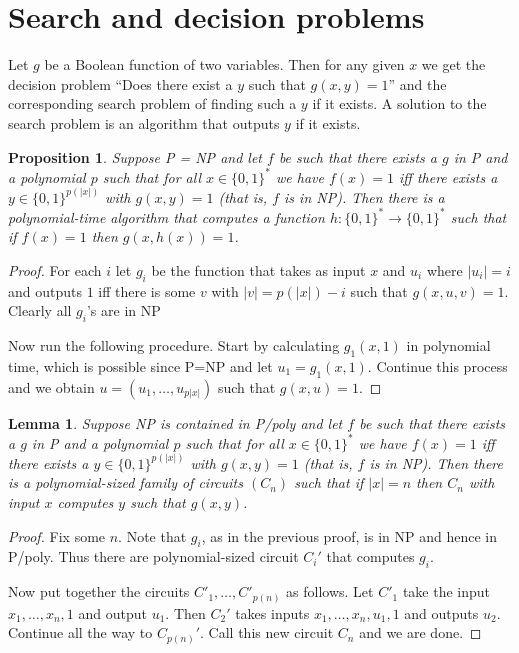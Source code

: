 \documentclass{report}
\theoremstyle{definition}
\theoremstyle{plain}
\newtheorem{prop}[thm]{Proposition}
\newtheorem{lem}[thm]{Lemma}
\theoremstyle{definition}
\begin{document}
	\section{Search and decision problems}
	Let $g$ be a Boolean function of two variables. Then for any given $x$ we get the decision problem ``Does there exist a $y$ such that $g(x,y) = 1$'' and the corresponding search problem of finding such a $y$ if it exists. A solution to the search problem is an algorithm that outputs $y$ if it exists.
	\begin{prop}
		Suppose P = NP and let $f$ be such that there exists a $g$ in P and a polynomial $p$ such that for all $x\in\{0,1\}^*$ we have $f(x) = 1$ iff there exists a $y\in\{0,1\}^{p(|x|)}$ with $g(x,y) = 1$ (that is, $f$ is in NP). Then there is a polynomial-time algorithm that computes a function $h\colon \{0,1\}^* \to \{0,1\}^*$ such that if $f(x) = 1$ then $g(x,h(x)) = 1$.
	\end{prop}
	\begin{proof}
		For each $i$ let $g_i$ be the function that takes as input $x$ and $u_i$ where $|u_i| = i$ and outputs $1$ iff there is some $v$ with $|v| = p(|x|) - i$ such that $g(x, u,v) = 1$. Clearly all $g_i$'s are in NP
		
		Now run the following procedure. Start by calculating $g_1(x,1)$ in polynomial time, which is possible since P=NP and let $u_1 = g_1(x,1)$. Continue this process and we obtain $u = (u_1,\ldots, u_{p|x|})$ such that $g(x,u) = 1$.
	\end{proof}
	\begin{lem}\label{lem:np_in_p/poly_imp_crct}
		Suppose NP is contained in P/poly and let $f$ be such that there exists a $g$ in P and a polynomial $p$ such that for all $x\in\{0,1\}^*$ we have $f(x) = 1$ iff there exists a $y\in\{0,1\}^{p(|x|)}$ with $g(x,y) = 1$ (that is, $f$ is in NP). Then there is a polynomial-sized family of circuits $(C_n)$ such that if $|x| = n$ then $C_n$ with input $x$ computes $y$ such that $g(x,y)$.  
	\end{lem}
	\begin{proof}
		Fix some $n$. Note that $g_i$, as in the previous proof, is in NP and hence in P/poly. Thus there are polynomial-sized circuit $C_i'$ that computes $g_i$.
		
		Now put together the circuits $C'_1, \ldots, C'_{p(n)}$ as follows. Let $C'_1$ take the input $x_1,\ldots, x_n,1$ and output $u_1$. Then $C_2'$ takes inputs $x_1,\ldots, x_n, u_1,1$ and outputs $u_2$. Continue all the way to $C_{p(n)}'$. Call this new circuit $C_n$ and we are done.
	\end{proof}
\end{document}
